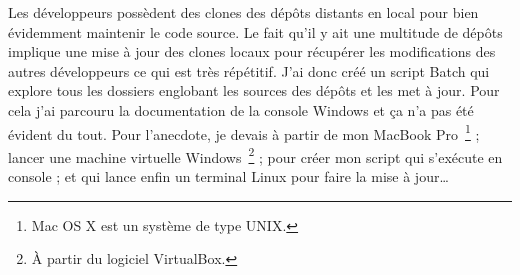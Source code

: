 Les développeurs possèdent des clones des dépôts distants en local pour
bien évidemment maintenir le code source. Le fait qu'il y ait une
multitude de dépôts implique une mise à jour des clones locaux pour
récupérer les modifications des autres développeurs ce qui est très
répétitif. J'ai donc créé un script Batch qui explore tous les dossiers
englobant les sources des dépôts et les met à jour. Pour cela j'ai
parcouru la documentation de la console Windows et ça n'a pas été
évident du tout. Pour l'anecdote, je devais à partir de mon MacBook
Pro\, \footnote{Mac OS X est un système de type UNIX.} ; lancer une
machine virtuelle Windows\, \footnote{À partir du logiciel VirtualBox.}
; pour créer mon script qui s'exécute en console ; et qui lance enfin un
terminal Linux pour faire la mise à jour\dots

